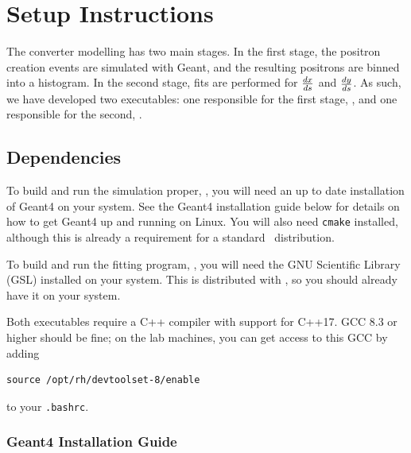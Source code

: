 \documentclass[12pt]{article}
\begin{document}
\section{Setup Instructions}
The converter modelling has two main stages.
In the first stage, the positron creation events are simulated with Geant, and the resulting positrons are binned into a histogram.
In the second stage, fits are performed for $\frac{dx}{ds}$ and $\frac{dy}{ds}$.
As such, we have developed two executables: one responsible for the first stage, \exes, and one responsible for the second, \exef.

\subsection{Dependencies}
To build and run the simulation proper, \exes, you will need an up to date installation of Geant4 on your system.
See the Geant4 installation guide below for details on how to get Geant4 up and running on Linux.
You will also need \texttt{cmake} installed, although this is already a requirement for a standard \bmad \, distribution.

To build and run the fitting program, \exef, you will need the GNU Scientific Library (GSL) installed on your system.
This is distributed with \bmad, so you should already have it on your system.

Both executables require a C++ compiler with support for C++17.
GCC 8.3 or higher should be fine; on the lab machines, you can get access to this GCC by adding
\begin{verbatim}
source /opt/rh/devtoolset-8/enable
\end{verbatim}
to your \texttt{.bashrc}.

\subsubsection{Geant4 Installation Guide}
\end{document}
